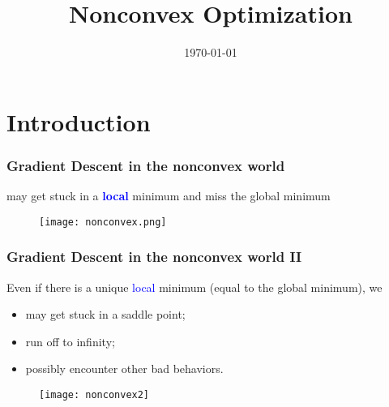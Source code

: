 \documentclass[aspectratio=149]{beamer}
\title{Nonconvex Optimization}
\date{\today}
\begin{document}
\maketitle
\frame{\tableofcontents}

\section{Introduction}

\begin{frame}
  \frametitle{Gradient Descent in the nonconvex world}

  may get stuck in a \textbf{\textcolor{blue}{local}} minimum and miss the global minimum

  \begin{figure}[ht]
    \centering
    \texttt{[image: nonconvex.png]}
  \end{figure}
\end{frame}


\begin{frame}
  \frametitle{Gradient Descent in the nonconvex world II}
  Even if there is a unique \textcolor{blue}{local} minimum (equal to the global minimum), we
  \begin{itemize}
    \item  may get stuck in a saddle point;
    \item run off to infinity;
    \item possibly encounter other bad behaviors.
  \end{itemize}
  \begin{figure}[ht]
    \centering
    \texttt{[image: nonconvex2]}
  \end{figure}
\end{frame}


\end{document}
